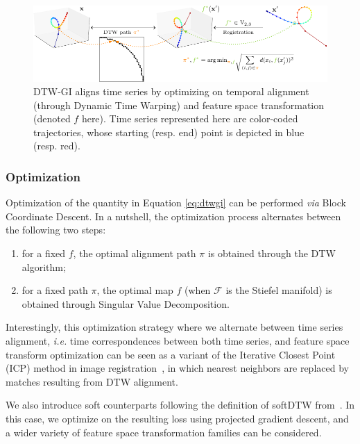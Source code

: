 \begin{figure}[t]
    \includegraphics[width=\linewidth]{fig/dtw_gi_cropped}
    \caption{DTW-GI aligns time series by optimizing on temporal alignment
    (through Dynamic Time Warping) and feature space transformation (denoted
    $f$ here). Time series represented here are color-coded trajectories, whose
    starting (resp. end) point is depicted in blue (resp. red).}
    \label{fig:dtw-gi}
\end{figure}



\subsubsection{Optimization}

Optimization of the quantity in Equation \eqref{eq:dtwgi} can be performed
\emph{via} Block Coordinate Descent.
In a nutshell, the optimization process alternates between the following
two steps:

\begin{enumerate}
\item for a fixed $f$, the optimal alignment path $\pi$ is obtained through the
DTW algorithm;
\item for a fixed path $\pi$, the optimal map $f$ (when $\mathcal{F}$ is the
Stiefel manifold) is obtained through Singular Value Decomposition.
\end{enumerate}

Interestingly, this optimization strategy where we alternate between time
series alignment, \emph{i.e.} time correspondences between both time series, and
feature space transform optimization can be seen as a variant of the Iterative
Closest Point (ICP) method in image registration~\cite{CHEN1992145}, in
which  nearest neighbors are replaced by matches resulting from DTW alignment.

We also introduce soft counterparts following the definition of softDTW
from~\cite{cuturi2017soft}.
In this case, we optimize on the resulting loss using projected gradient
descent, and a wider variety of
feature space transformation families can be considered.

